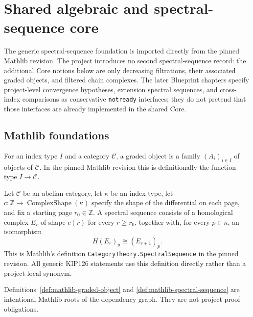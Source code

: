 \chapter{Shared algebraic and spectral-sequence core}
\label{chap:core-spectral-sequence}

The generic spectral-sequence foundation is imported directly from the pinned
Mathlib revision.  The project introduces no second spectral-sequence record:
the additional Core notions below are only decreasing filtrations, their
associated graded objects, and filtered chain complexes.  The later Blueprint
chapters specify project-level convergence hypotheses, extension spectral
sequences, and cross-index comparisons as conservative \texttt{notready}
interfaces; they do not pretend that those interfaces are already implemented
in the shared Core.

\section{Mathlib foundations}

\begin{definition}
  \label{def:mathlib-graded-object}
  \mathlibok
  For an index type $I$ and a category $\mathcal C$, a graded object is a
  family $(A_i)_{i\in I}$ of objects of $\mathcal C$.  In the pinned Mathlib
  revision this is definitionally the function type $I\to\mathcal C$.
\end{definition}

\begin{definition}
  \label{def:mathlib-spectral-sequence}
  \mathlibok
  Let $\mathcal C$ be an abelian category, let $\kappa$ be an index type, let
  $c : \mathbb Z \to \operatorname{ComplexShape}(\kappa)$ specify the shape
  of the differential on each page, and fix a starting page $r_0\in\mathbb Z$.
  A spectral sequence consists of a homological complex $E_r$ of shape $c(r)$
  for every $r\ge r_0$, together with, for every $p\in\kappa$, an isomorphism
  \[
    H(E_r)_p \cong (E_{r+1})_p.
  \]
  This is Mathlib's definition \texttt{CategoryTheory.SpectralSequence} in
  the pinned revision.  All generic KIP126 statements use this definition
  directly rather than a project-local synonym.
\end{definition}

Definitions~\ref{def:mathlib-graded-object} and
\ref{def:mathlib-spectral-sequence} are intentional Mathlib roots of the
dependency graph.  They are not project proof obligations.

